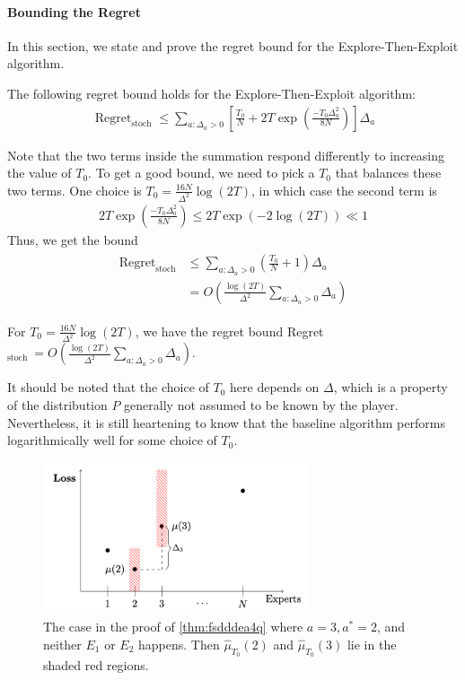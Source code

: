 \documentclass{article}
\begin{document}
\paragraph{Bounding the Regret}
In this section, we state and prove the regret bound for the Explore-Then-Exploit algorithm.
\begin{thma}\label{thm:fsdddea4q}
The following regret bound holds for the Explore-Then-Exploit algorithm:
\begin{align*}
\operatorname{ Regret }_{\mathrm{stoch }} \leq \sum_{a: \Delta_{a}>0}\left[\frac{T_{0}}{N}+2 T \exp \left(\frac{-T_{0} \Delta_{a}^{2}}{8 N}\right)\right] \Delta_{a}
\end{align*}
\end{thma}
Note that the two terms inside the summation respond differently to increasing the value of $T_{0}$. To get a good bound, we need to pick a $T_{0}$ that balances these two terms. One choice is $T_{0}=\frac{16 N}{\Delta^{2}} \log (2 T)$, in which case the second term is
\begin{align*}
2 T \exp \left(\frac{-T_{0} \Delta_{a}^{2}}{8 N}\right) \leq 2 T \exp (-2 \log (2 T)) \ll 1
\end{align*}
Thus, we get the bound
\begin{align*}
\begin{aligned}
\operatorname{ Regret }_{\mathrm{stoch }} & \leq \sum_{a: \Delta_{a}>0}\left(\frac{T_{0}}{N}+1\right) \Delta_{a} \\
&=O\left(\frac{\log (2 T)}{\Delta^{2}} \sum_{a: \Delta_{a}>0} \Delta_{a}\right)
\end{aligned}
\end{align*}
\begin{cora}
 For $T_{0}=\frac{16 N}{\Delta^{2}} \log (2 T)$, we have the regret bound Regret $_{\text {stoch }}=O\left(\frac{\log (2 T)}{\Delta^{2}} \sum_{a: \Delta_{a}>0} \Delta_{a}\right) .$
\end{cora} 
\begin{rema}
  It should be noted that the choice of $T_{0}$ here depends on $\Delta$, which is a property of the distribution $P$ generally not assumed to be known by the player. Nevertheless, it is still heartening to know that the baseline algorithm performs logarithmically well for some choice of $T_{0}$.
\end{rema}
\begin{figure}[H]
    \centering
    \includegraphics[width=0.7\textwidth]{Figs/5.png}
    \caption{The case in the proof of \cref{thm:fsdddea4q} where $a=3, a^{*}=2$, and neither $E_{1}$ or $E_{2}$ happens. Then $\hat{\mu}_{T_{0}}(2)$ and $\hat{\mu}_{T_{0}}(3)$ lie in the shaded red regions.}
    \label{fig:eezcvsafd}
\end{figure}
\end{document}
